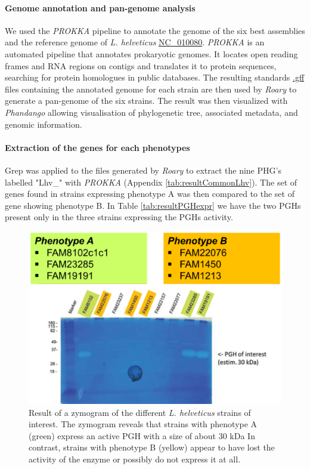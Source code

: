 \documentclass[10pt,a4paper]{article}
\begin{document}
\paragraph{Genome annotation and pan-genome analysis}
We used the \textit{PROKKA} pipeline\cite{seemann_prokka:_2014} to annotate the genome of the six best assemblies and the reference genome of \textit{L. helveticus} \href{https://www.ncbi.nlm.nih.gov/genome/?term=NC_010080}{NC\_010080}. \textit{PROKKA} is an automated pipeline that annotates prokaryotic genomes. It locates open reading frames and RNA regions on contigs and translates it to protein sequences, searching for protein homologues in public databases. The resulting standards \href{https://www.ensembl.org/info/website/upload/gff.html}{.gff} files containing the annotated genome for each strain are then used by \textit{Roary}\cite{page_roary:_2015} to generate a pan-genome of the six strains. The result was then visualized with \textit{Phandango}\cite{hadfield_phandango:_2018} allowing visualisation of phylogenetic tree, associated metadata, and genomic information.


\paragraph{Extraction of the genes for each phenotypes} Grep was applied to the files generated by \textit{Roary} to extract the nine PHG's \cite{jebava_nine_2011} labelled "Lhv\_" with \textit{PROKKA} (Appendix \ref{tab:resultCommonLhv}). The set of genes found in strains expressing phenotype A was then compared to the set of gene showing phenotype B. In Table \ref{tab:resultPGHexpr} we have the two PGHs present only in the three strains expressing the PGHs activity. 


\begin{figure}
	\centering
	\includegraphics[width=0.7\linewidth]{img/zymography}
	\caption[The two phenotypes expressed by the six strains]{Result of a zymogram of the different \textit{L. helveticus} strains of interest. The zymogram reveals that strains with phenotype A (green) express an active PGH with a size of about 30 kDa In contrast, strains with phenotype B (yellow) appear to have lost the activity of the enzyme or possibly do not express it at all.}
	\label{fig:zymography}
\end{figure}
\end{document}
